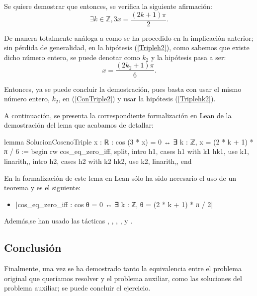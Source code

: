 \begin{demostracion}
  Se quiere demostrar que entonces, se verifica la siguiente afirmación:
  \begin{equation}\label{ConTriple2}
    ∃ k ∈ ℤ, 3x = \frac{(2k+1)π}{2}.
  \end{equation}

  De manera totalmente análoga a como se ha procedido en la implicación
  anterior; sin pérdida de generalidad, en la hipótesis
  (\ref{Tripleh2}), como sabemos que existe dicho número entero, se
  puede denotar como \(k_2\) y la hipótesis pasa a ser:
  \begin{equation}\label{Triplehk2}\tag{hk2}
     x = \frac{(2k_2+1)π}{6}.
   \end{equation}

   Entonces, ya se puede concluir la demostración, pues basta con usar
   el mismo número entero, \(k_2\), en (\ref{ConTriple2}) y usar la
   hipótesis (\ref{Triplehk2}).
\end{demostracion}

A continuación, se presenta la correspondiente formalización en Lean de
la demostración del lema que acabamos de detallar:
\begin{leancode}
lemma SolucionCosenoTriple
  {x : ℝ}
  : cos (3 * x) = 0 ↔ ∃ k : ℤ, x = (2 * k + 1) * π / 6 :=
begin
  rw cos_eq_zero_iff,
  split,
  { intro h1,
    cases h1 with k1 hk1,
    use k1,
    linarith,},
  { intro h2,
    cases h2 with k2 hk2,
    use k2,
    linarith,},
end
\end{leancode}

En la formalización de este lema en Lean sólo ha sido necesario el uso
de un teorema y es el siguiente:
\begin{itemize}
\item {}|cos_eq_zero_iff : cos θ = 0 ↔ ∃ k : ℤ, θ = (2 * k + 1) * π / 2|
\end{itemize}
Además,se han usado las tácticas
,
,
,
,
 y
.

\subsection{Conclusión}

Finalmente, una vez se ha demostrado tanto la equivalencia entre el
problema original que queríamos resolver y el problema auxiliar, como
las soluciones del problema auxiliar; se puede concluir el ejercicio.

